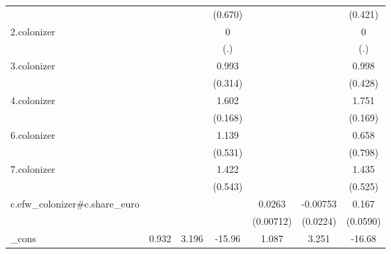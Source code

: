 {\begin{tabular}{l*{6}{c}}
            &                     &                     &     (0.670)         &                     &                     &     (0.421)         \\
[1em]
2.colonizer &                     &                     &           0         &                     &                     &           0         \\
            &                     &                     &         (.)         &                     &                     &         (.)         \\
[1em]
3.colonizer &                     &                     &       0.993\sym{**} &                     &                     &       0.998\sym{*}  \\
            &                     &                     &     (0.314)         &                     &                     &     (0.428)         \\
[1em]
4.colonizer &                     &                     &       1.602\sym{***}&                     &                     &       1.751\sym{***}\\
            &                     &                     &     (0.168)         &                     &                     &     (0.169)         \\
[1em]
6.colonizer &                     &                     &       1.139\sym{*}  &                     &                     &       0.658         \\
            &                     &                     &     (0.531)         &                     &                     &     (0.798)         \\
[1em]
7.colonizer &                     &                     &       1.422\sym{*}  &                     &                     &       1.435\sym{*}  \\
            &                     &                     &     (0.543)         &                     &                     &     (0.525)         \\
[1em]
c.efw\_colonizer#c.share\_euro&                     &                     &                     &      0.0263\sym{***}&    -0.00753         &       0.167\sym{**} \\
            &                     &                     &                     &   (0.00712)         &    (0.0224)         &    (0.0590)         \\
[1em]
\_cons      &       0.932         &       3.196\sym{*}  &      -15.96\sym{**} &       1.087         &       3.251\sym{**} &      -16.68\sym{***}\\

\end{tabular}}

